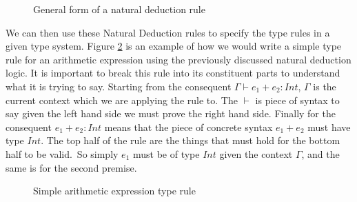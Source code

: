 \begin{figure}[H]
    \begin{prooftree}
    \end{prooftree}
    \caption{General form of a natural deduction rule}
    \label{fig:generalNatDectRule}
\end{figure}

We can then use these Natural Deduction rules to specify the type rules in a given type system\cite{ranta2012implementing,cardelli1996type,barendregt_1991}.
Figure \ref{fig:simpleTypeRule} is an example of how we would write a simple type rule for an arithmetic expression using the previously discussed natural deduction logic.
It is important to break this rule into its constituent parts to understand what it is trying to say.
Starting from the consequent $\Gamma \vdash e_1 + e_2 : Int$, $\Gamma$ is the current context which we are applying the rule to.
The $\vdash$ is piece of syntax to say given the left hand side we must prove the right hand side.
Finally for the consequent $e_1 + e_2 : Int$ means that the piece of concrete syntax $e_1 + e_2$ must have type $Int$.
The top half of the rule are the things that must hold for the bottom half to be valid.\
So simply $e_1$ must be of type $Int$ given the context $\Gamma$, and the same is for the second premise\cite{cardelli1996type,ranta2012implementing,barendregt_1991}.

\begin{figure}[H]
    \begin{prooftree}
    \end{prooftree}
    \caption{Simple arithmetic expression type rule}
    \label{fig:simpleTypeRule}
\end{figure}